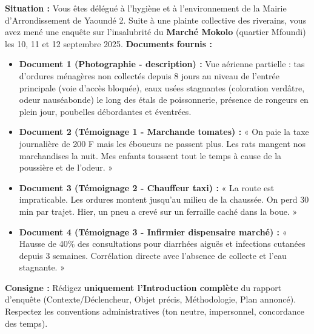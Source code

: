 \documentclass[11pt]{article}
\begin{document}
\begin{exercice}
\textbf{Situation :} Vous êtes délégué à l'hygiène et à l'environnement de la Mairie d'Arrondissement de Yaoundé 2. Suite à une plainte collective des riverains, vous avez mené une enquête sur l'insalubrité du \textbf{Marché Mokolo} (quartier Mfoundi) les 10, 11 et 12 septembre 2025.
\textbf{Documents fournis :}
\begin{itemize}
    \item \textbf{Document 1 (Photographie - description) :} Vue aérienne partielle : tas d'ordures ménagères non collectés depuis 8 jours au niveau de l'entrée principale (voie d'accès bloquée), eaux usées stagnantes (coloration verdâtre, odeur nauséabonde) le long des étals de poissonnerie, présence de rongeurs en plein jour, poubelles débordantes et éventrées.
    \item \textbf{Document 2 (Témoignage 1 - Marchande tomates) :} « On paie la taxe journalière de 200 F mais les éboueurs ne passent plus. Les rats mangent nos marchandises la nuit. Mes enfants toussent tout le temps à cause de la poussière et de l'odeur. »
    \item \textbf{Document 3 (Témoignage 2 - Chauffeur taxi) :} « La route est impraticable. Les ordures montent jusqu'au milieu de la chaussée. On perd 30 min par trajet. Hier, un pneu a crevé sur un ferraille caché dans la boue. »
    \item \textbf{Document 4 (Témoignage 3 - Infirmier dispensaire marché) :} « Hausse de 40\% des consultations pour diarrhées aiguës et infections cutanées depuis 3 semaines. Corrélation directe avec l'absence de collecte et l'eau stagnante. »
\end{itemize}
\textbf{Consigne :} Rédigez \textbf{uniquement l'Introduction complète} du rapport d'enquête (Contexte/Déclencheur, Objet précis, Méthodologie, Plan annoncé). Respectez les conventions administratives (ton neutre, impersonnel, concordance des temps).
\end{exercice}
\end{document}
